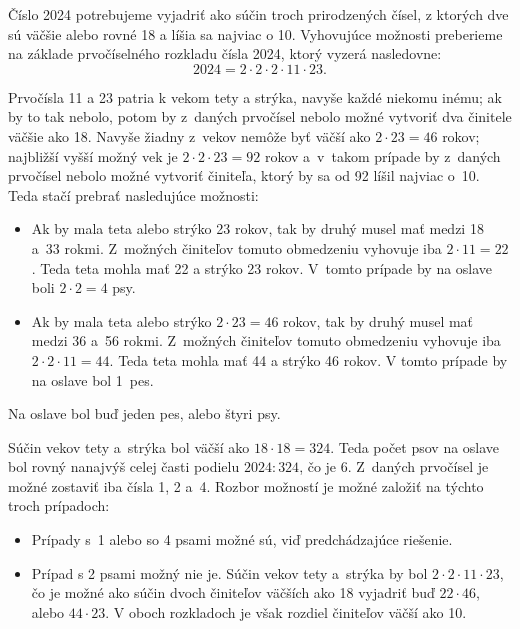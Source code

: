 {%
Číslo 2024 potrebujeme vyjadriť ako súčin troch prirodzených čísel, z ktorých dve sú väčšie alebo rovné 18 a líšia sa najviac o 10.
Vyhovujúce možnosti preberieme na základe prvočíselného rozkladu čísla 2024, ktorý vyzerá nasledovne:
$$
2024 =2\cdot2\cdot2\cdot11\cdot23.
$$

Prvočísla 11 a 23 patria k vekom tety a strýka, navyše každé niekomu inému; ak by to tak nebolo, potom by z~daných prvočísel nebolo možné vytvoriť dva činitele väčšie ako 18.
Navyše žiadny z~vekov nemôže byť väčší ako $2\cdot23=46$ rokov; najbližší vyšší možný vek je $2\cdot2\cdot23=92$ rokov a~v~takom prípade by z~daných prvočísel nebolo možné vytvoriť činiteľa, ktorý by sa od 92 líšil najviac o~10.
Teda stačí prebrať nasledujúce možnosti:
\begin{itemize}
\item
Ak by mala teta alebo strýko 23 rokov, tak by druhý musel mať medzi 18 a~33 rokmi.
Z~možných činiteľov tomuto obmedzeniu vyhovuje iba $2\cdot11=22$.
Teda teta mohla mať 22 a strýko 23 rokov.
V~tomto prípade by na oslave boli $2\cdot2=4$ psy.
\item
Ak by mala teta alebo strýko $2\cdot23=46$ rokov, tak by druhý musel mať medzi 36 a~56 rokmi.
Z~možných činiteľov tomuto obmedzeniu vyhovuje iba $2\cdot2\cdot11=44$.
Teda teta mohla mať 44 a strýko 46 rokov.
V tomto prípade by na oslave bol 1~pes.
\end{itemize}

Na oslave bol buď jeden pes, alebo štyri psy.

\poznamka
Súčin vekov tety a~strýka bol väčší ako $18\cdot18=324$.
Teda počet psov na oslave bol rovný nanajvýš celej časti podielu $2024:324$, čo je 6.
Z~daných prvočísel je možné zostaviť iba čísla 1, 2 a~4.
Rozbor možností je možné založiť na týchto troch prípadoch:
\begin{itemize}
\item Prípady s~1 alebo so 4 psami možné sú, viď predchádzajúce riešenie.
\item Prípad s 2 psami možný nie je.
Súčin vekov tety a~strýka by bol $2\cdot2\cdot11\cdot23$, čo je možné ako súčin dvoch činiteľov väčších ako 18 vyjadriť buď $22\cdot46$, alebo $44\cdot23$.
V oboch rozkladoch je však rozdiel činiteľov väčší ako 10.
\end{itemize}
}

